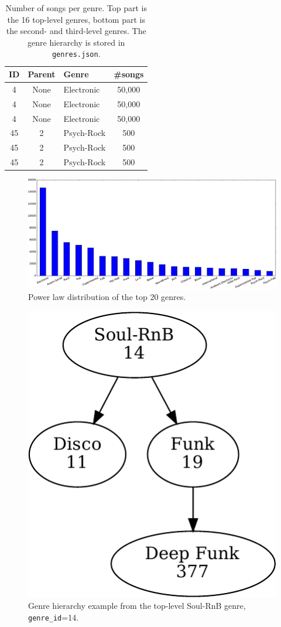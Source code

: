 \documentclass{article}
\begin{document}
\begin{table}
	\centering
	\begin{tabular}{cclc}
		\toprule
		ID & Parent & Genre & \#songs \\
		\midrule
		4 & None & Electronic & 50,000 \\
		4 & None & Electronic & 50,000 \\
		4 & None & Electronic & 50,000 \\
		\midrule
		45 & 2 & Psych-Rock & 500 \\
		45 & 2 & Psych-Rock & 500 \\
		45 & 2 & Psych-Rock & 500 \\
		\bottomrule
	\end{tabular}
	\caption{Number of songs per genre. Top part is the 16 top-level genres, bottom part is the second- and third-level genres. The genre hierarchy is stored in \texttt{genres.json}.}
	\label{tab:genres}
\end{table}

\begin{figure}
	\centering
	\includegraphics[width=\linewidth]{histo_large.pdf}
	\caption{Power law distribution of the top 20 genres.}
	\label{fig:genres}
\end{figure}

\begin{figure}
	\centering
	\includegraphics[width=0.5\linewidth]{genre_hierarchy.pdf}
	\caption{Genre hierarchy example from the top-level Soul-RnB genre, \texttt{genre\_id}=14.}
	\label{fig:genre_hierarchy}
\end{figure}
\end{document}
